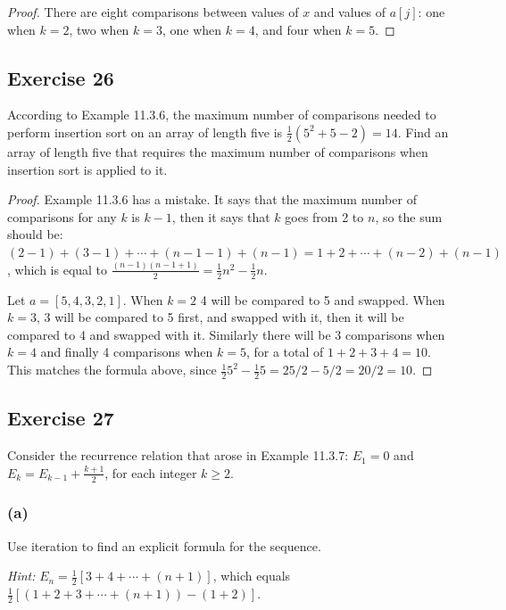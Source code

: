 \documentclass[14pt]{extarticle}
\newcommand{\dps}{\displaystyle}
\begin{document}
\begin{proof}
    There are eight comparisons between values of \(x\) and values of \(a[j]\): one when \(k = 2\), two when \(k = 3\), one when
    \(k = 4\), and four when \(k = 5\).
\end{proof}

\subsection{Exercise 26}
According to Example 11.3.6, the maximum number of comparisons needed to perform insertion sort on an array of length five is
\(\frac{1}{2}(5^2 + 5 - 2) = 14\). Find an array of length five that requires the maximum number of comparisons when
insertion sort is applied to it.

\begin{proof}
    Example 11.3.6 has a mistake. It says that the maximum number of comparisons for any \(k\) is \(k-1\), then it says that
    \(k\) goes from 2 to \(n\), so the sum should be: \((2-1) + (3-1) + \cdots + (n-1-1) + (n-1) = 1+2+\cdots+(n-2)+(n-1)\),
    which is equal to \(\dps\frac{(n-1)(n-1+1)}{2} = \frac{1}{2}n^2 - \frac{1}{2}n\).

    Let \(a = [5,4,3,2,1]\). When \(k=2\) 4 will be compared to 5 and swapped. When \(k=3\), 3 will be compared to 5 first, and
    swapped with it, then it will be compared to 4 and swapped with it. Similarly there will be 3 comparisons when \(k=4\)
    and finally 4 comparisons when \(k=5\), for a total of \(1+2+3+4 = 10\). This matches the formula above, since
    \(\dps\frac{1}{2}5^2 - \frac{1}{2}5 = 25/2 - 5/2 = 20/2= 10\).
\end{proof}

\subsection{Exercise 27}
Consider the recurrence relation that arose in Example 11.3.7: \(E_1 = 0\) and \(E_k = E_{k-1} + \frac{k+1}{2}\), for each
integer \(k \geq 2\).

\subsubsection{(a)}
Use iteration to find an explicit formula for the sequence.

    {\it Hint:} \(E_n = \frac{1}{2}[3 + 4 + \cdots + (n + 1)]\), which equals \(\frac{1}{2}[(1 + 2 + 3 + \cdots + (n + 1)) -
    (1 + 2)]\).
\end{document}
